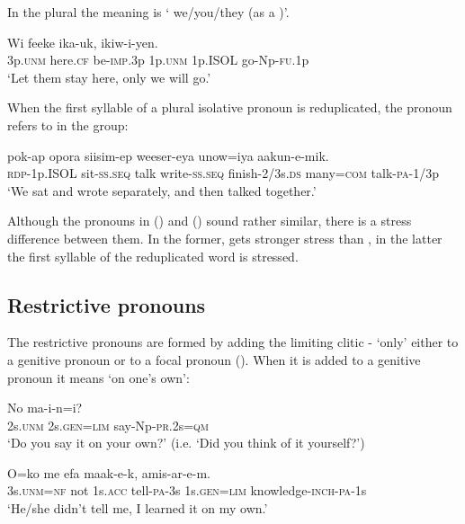 In the plural the meaning is ` we/you/they (as a )'. 

\ea%
\label{ex:x602}
\gll Wi feeke ika-uk,   ikiw-i-yen. \\
3p.\textsc{unm} here.\textsc{cf} be-\textsc{imp}.3p 1p.\textsc{unm} 1p.ISOL go-Np-\textsc{fu}.1p\\
\glt`Let them stay here, only we will go.'
\z

When the first syllable of a plural isolative pronoun is reduplicated, the pronoun refers to  in the group:

\ea%
\label{ex:x603}
\gll {} pok-ap opora siisim-ep weeser-eya unow=iya aakun-e-mik.\\
\textsc{rdp}-1p.ISOL sit-\textsc{ss}.\textsc{seq} talk write-\textsc{ss}.\textsc{seq} finish-2/3s.\textsc{ds} many=\textsc{com} talk-\textsc{pa}-1/3p\\
\glt`We sat and wrote separately, and then talked together.'
\z

Although the pronouns in () and () sound rather similar, there is a stress difference between them. In the former,  gets stronger stress than , in the latter the first syllable of the reduplicated word is stressed.

\subsection{Restrictive pronouns}
{}
The restrictive pronouns are formed by adding the limiting clitic - `only' either to a genitive pronoun or to a focal pronoun (). When it is added to a genitive pronoun it means `on one's own':

\ea%
\label{ex:x605}
\gll No  ma-i-n=i? \\
2s.\textsc{unm} 2s.\textsc{gen}=\textsc{lim} say-Np-\textsc{pr}.2s=\textsc{qm}\\
\glt`Do you say it on your own?' (i.e. `Did you think of it yourself?')
\z

\ea%
\label{ex:x606}
\gll O=ko me efa maak-e-k,  amis-ar-e-m.\\
3s.\textsc{unm}=\textsc{nf} not 1s.\textsc{acc} tell-\textsc{pa}-3s 1s.\textsc{gen}=\textsc{lim} knowledge-\textsc{inch}-\textsc{pa}-1s\\
\glt`He/she didn't tell me, I learned it on my own.'
\z

